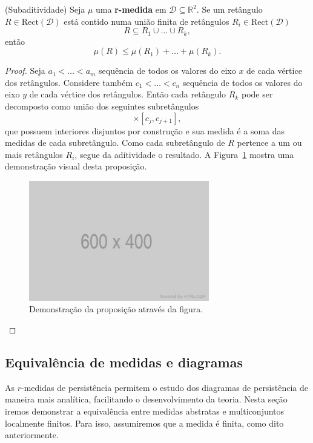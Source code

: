 \begin{propo}{(Subaditividade)} 
    Seja $\mu$ uma \textbf{r-medida} em $\mathcal{D} \subseteq \mathbb{R}^2$. Se um retângulo $R \in 
    \text{Rect}(\mathcal{D})$ está contido numa união finita de retângulos $R_i \in \text{Rect}(
    \mathcal{D})$
    \begin{equation*}
        R \subseteq R_1 \cup \dots \cup R_k,
    \end{equation*}
    então
    \begin{equation*}
        \mu(R) \leq \mu(R_1) + \dots + \mu(R_k).
    \end{equation*}
\end{propo}
\begin{proof}
    Seja $a_1 < \dots < a_m$ sequência de todos os valores do eixo $x$ de cada vértice dos retângulos. 
    Considere também $c_1 < \dots < c_n$ sequência de todos os valores do eixo $y$ de cada vértice dos retângulos.
    Então cada retângulo $R_k$ pode ser decomposto como união dos seguintes subretângulos
    \begin{equation*}
        [a_i, a_{i+1}] \times [c_j, c_{j+1}],
    \end{equation*}
    que possuem interiores disjuntos por construção e sua medida é a soma das medidas de cada subretângulo. 
    Como cada subretângulo de $R$ pertence a um ou mais retângulos $R_i$, segue da aditividade o resultado.
    A Figura~\ref{fig:dem_subadd} mostra uma demonstração visual desta proposição. 
    \begin{figure}[htpb!]
        \centering
        \includegraphics[width=0.7\textwidth]{images/placeholder.png}
        \caption{Demonstração da proposição através da figura.}
        \label{fig:dem_subadd}
    \end{figure}
\end{proof}

\subsection{Equivalência de medidas e diagramas}
As $r$-medidas de persistência permitem o estudo dos diagramas de persistência de maneira mais analítica,
facilitando o desenvolvimento da teoria. Nesta seção iremos demonstrar a equivalência entre medidas 
abstratas e multiconjuntos localmente finitos. Para isso, assumiremos que a medida é finita, como dito
anteriormente. 

